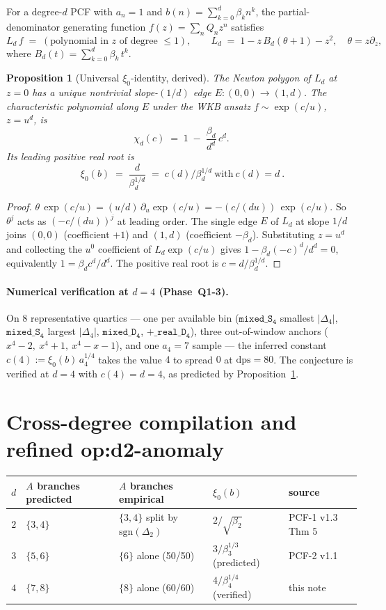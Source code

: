 \documentclass[11pt]{amsart}
\newtheorem{proposition}[theorem]{Proposition}
\begin{document}
For a degree-$d$ PCF with $a_n=1$ and
$b(n)=\sum_{k=0}^{d}\beta_k n^k$, the partial-denominator generating
function $f(z)=\sum_n Q_n z^n$ satisfies
\[
L_d\,f \;=\; (\text{polynomial in } z\text{ of degree }\le 1),\qquad
L_d \;=\; 1 - z\,B_d(\theta+1) - z^2,\quad \theta=z\partial_z,
\]
where $B_d(t)=\sum_{k=0}^{d}\beta_k\,t^k$.

\begin{proposition}[Universal $\xi_0$-identity, derived]\label{prop:xi0-univ}
The Newton polygon of $L_d$ at $z=0$ has a unique nontrivial slope-$(1/d)$
edge $E:(0,0)\to(1,d)$. The characteristic polynomial along $E$ under
the WKB ansatz $f\sim\exp(c/u)$, $z=u^d$, is
\[
\chi_d(c)\;=\;1\;-\;\frac{\beta_d}{d^d}\,c^d.
\]
Its leading positive real root is
\[
\boxed{\ \xi_0(b)\;=\;\frac{d}{\beta_d^{1/d}}\;=\;c(d)/\beta_d^{1/d}\ \text{with}\ c(d)=d\ }.
\]
\end{proposition}

\begin{proof}
$\theta\,\exp(c/u)=(u/d)\,\partial_u\exp(c/u)=-(c/(d u))\,\exp(c/u)$.
So $\theta^j$ acts as $(-c/(d u))^j$ at leading order. The single
edge $E$ of $L_d$ at slope $1/d$ joins $(0,0)$ (coefficient $+1$)
and $(1,d)$ (coefficient $-\beta_d$). Substituting $z=u^d$ and
collecting the $u^0$ coefficient of $L_d \exp(c/u)$ gives
$1 - \beta_d (-c)^d/d^d=0$, equivalently $1=\beta_d c^d/d^d$.
The positive real root is $c=d/\beta_d^{1/d}$.
\end{proof}

\paragraph{Numerical verification at $d=4$ (Phase~Q1-3).}
On $8$ representative quartics --- one per available bin
($\mathtt{mixed\_S_4}$ smallest $|\Delta_4|$, $\mathtt{mixed\_S_4}$
largest $|\Delta_4|$, $\mathtt{mixed\_D_4}$, $\mathtt{+\_real\_D_4}$),
three out-of-window anchors ($x^4-2,\ x^4+1,\ x^4-x-1$), and one
$a_4=7$ sample --- the inferred constant
$c(4):=\xi_0(b)\,a_4^{1/4}$ takes the value $4$ to spread $0$ at
$\mathrm{dps}=80$. The conjecture is verified at $d=4$ with
$c(4)=d=4$, as predicted by Proposition~\ref{prop:xi0-univ}.

\section{Cross-degree compilation and refined op:d2-anomaly}

\begin{table}[h]
\centering
\begin{tabular}{cllll}
\hline
$d$ & $A$ branches predicted & $A$ branches empirical & $\xi_0(b)$ & source \\
\hline
$2$ & $\{3,4\}$ & $\{3,4\}$ split by $\mathrm{sgn}(\Delta_2)$ &
$2/\sqrt{\beta_2}$ & PCF-1 v1.3 Thm 5 \\
$3$ & $\{5,6\}$ & $\{6\}$ alone (50/50) &
$3/\beta_3^{1/3}$ (predicted) & PCF-2 v1.1 \\
$4$ & $\{7,8\}$ & $\{8\}$ alone (60/60) &
$4/\beta_4^{1/4}$ (verified) & this note \\
\hline
\end{tabular}
\end{table}
\end{document}
